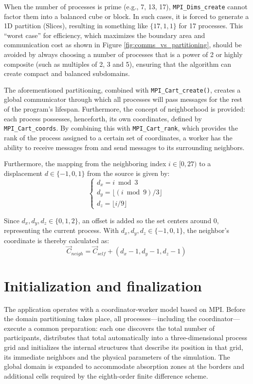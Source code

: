\documentclass[cic,tc,english]{infufrgs}
\begin{document}
When the number of processes is prime (e.g., 7, 13, 17),
\lstinline{MPI_Dims_create} cannot factor them into a balanced cube or
block. In such cases, it is forced to generate a 1D partition
(Slices), resulting in something like $\{17, 1, 1\}$ for 17 processes.
This ``worst case'' for efficiency, which maximizes the boundary area
and communication cost as shown in Figure
\ref{fig:comms_vs_partitioning}, should be avoided by always choosing
a number of processes that is a power of 2 or highly composite (such
as multiples of 2, 3 and 5), ensuring that the algorithm can create
compact and balanced subdomains.

The aforementioned partitioning, combined with \lstinline{MPI_Cart_create()},
creates a global communicator through which all processes will pass messages
for the rest of the program's lifespan. Furthermore, the concept of neighborhood
is provided: each process possesses, henceforth, its own coordinates, defined by
\lstinline{MPI_Cart_coords}. By combining this with \lstinline{MPI_Cart_rank},
which provides the rank of the process assigned to a certain set of coordinates,
a worker has the ability to receive messages from and send messages
to its surrounding
neighbors.

Furthermore, the mapping from the neighboring index $i \in [0, 27)$ to a
displacement $d \in \{-1, 0, 1\}$ from the source is given by:
\begin{equation}
  \begin{cases}
    d_x = i \bmod{3} \\
    d_y = \lfloor (i \bmod{9}) / 3 \rfloor \\
    d_z = \lfloor i / 9 \rfloor
  \end{cases}
\end{equation}

Since $d_x, d_y, d_z \in \{0, 1, 2\}$, an offset is added so
the set centers around $0$, representing the current process.
With $d_x, d_y, d_z \in \{-1, 0, 1\}$, the neighbor's coordinate is
thereby calculated as:
\begin{equation}
  \vec{C}_{neigh} = \vec{C}_{self} + (d_x - 1, d_y - 1, d_z - 1)
\end{equation}

\section{Initialization and finalization}
The application operates with a coordinator-worker model based on MPI.
Before the domain partitioning takes place, all processes---including
the \gls{coordinator}---execute a common preparation: each one discovers
the total number of participants, distributes that total automatically
into a three-dimensional process grid and initializes the internal
structures that describe its position in that grid, its immediate
neighbors and the physical parameters of the simulation. The global
domain is expanded to accommodate absorption zones at the borders and
additional cells required by the eighth-order finite difference scheme.
\end{document}

